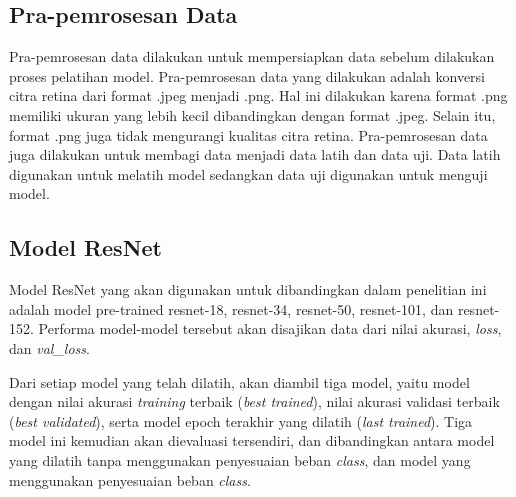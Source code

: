 \subsection{Pra-pemrosesan Data}
\label{sec:322}
Pra-pemrosesan data dilakukan untuk mempersiapkan data sebelum dilakukan proses pelatihan model. Pra-pemrosesan data yang dilakukan adalah konversi citra retina dari format .jpeg menjadi .png. Hal ini dilakukan karena format .png memiliki ukuran yang lebih kecil dibandingkan dengan format .jpeg. Selain itu, format .png juga tidak mengurangi kualitas citra retina. Pra-pemrosesan data juga dilakukan untuk membagi data menjadi data latih dan data uji. Data latih digunakan untuk melatih model sedangkan data uji digunakan untuk menguji model.

\subsection{Model ResNet}
\label{sec:323}
Model ResNet yang akan digunakan untuk dibandingkan dalam penelitian ini adalah model pre-trained resnet-18, resnet-34, resnet-50, resnet-101, dan resnet-152. Performa model-model tersebut akan disajikan data dari nilai akurasi, \emph{loss}, dan \emph{val\_loss}. 

Dari setiap model yang telah dilatih, akan diambil tiga model, yaitu model dengan nilai akurasi \emph{training} terbaik (\emph{best trained}), nilai akurasi validasi terbaik (\emph{best validated}), serta model epoch terakhir yang dilatih (\emph{last trained}). Tiga model ini kemudian akan dievaluasi tersendiri, dan dibandingkan antara model yang dilatih tanpa menggunakan penyesuaian beban \emph{class}, dan model yang menggunakan penyesuaian beban \emph{class}.

